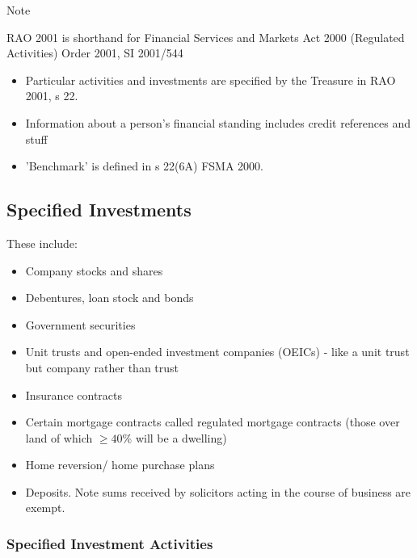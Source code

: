 \documentclass[
]{article}
\providecommand{\tightlist}{%
  \setlength{\itemsep}{0pt}\setlength{\parskip}{0pt}}
\newenvironment{env-a3cdf638-6f18-4b95-9378-c003a9523525}
{
    \savenotes\tcolorbox[blanker,breakable,left=5pt,borderline west={2pt}{-4pt}{blue}]
}
{
    \endtcolorbox\spewnotes
}
\begin{document}
\begin{env-a3cdf638-6f18-4b95-9378-c003a9523525}

Note

RAO 2001 is shorthand for Financial Services and Markets Act 2000
(Regulated Activities) Order 2001, SI 2001/544

\end{env-a3cdf638-6f18-4b95-9378-c003a9523525}

\begin{itemize}
\tightlist
\item
  Particular activities and investments are specified by the Treasure in
  RAO 2001, s 22.
\item
  Information about a person's financial standing includes credit
  references and stuff
\item
  'Benchmark' is defined in s 22(6A) FSMA 2000.
\end{itemize}

\hypertarget{specified-investments}{%
\subsection{Specified Investments}\label{specified-investments}}

These include:

\begin{itemize}
\tightlist
\item
  Company stocks and shares
\item
  Debentures, loan stock and bonds
\item
  Government securities
\item
  Unit trusts and open-ended investment companies (OEICs) - like a unit
  trust but company rather than trust
\item
  Insurance contracts
\item
  Certain mortgage contracts called regulated mortgage contracts (those
  over land of which {\(\geq 40\%\)} will be a dwelling)
\item
  Home reversion/ home purchase plans
\item
  Deposits. Note sums received by solicitors acting in the course of
  business are exempt.
\end{itemize}

\hypertarget{specified-investment-activities}{%
\subsubsection{Specified Investment
Activities}\label{specified-investment-activities}}
\end{document}
